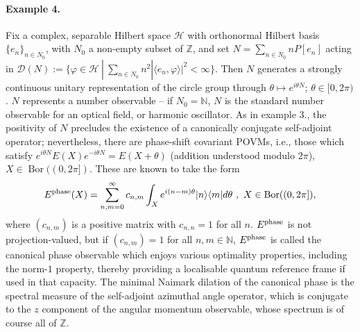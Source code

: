 \documentclass[sn-mathphys-num]{sn-jnl}%
\DeclareMathOperator{\Bor}{Bor}
\numberwithin{equation}{section}
\theoremstyle{thmstyleone}%
\theoremstyle{thmstyletwo}%
\theoremstyle{thmstylethree}%
\begin{document}
\paragraph{Example 4.}
Fix a complex, separable Hilbert space $\mathcal{H}$ with orthonormal Hilbert basis $\{e_n\}_{n \in N_0}$, with $N_0$ a non-empty subset of $\mathbb{Z}$, and set $N = \sum_{n\in N_0}n P[e_n]$ acting in $\mathcal{D}(N):=\{\varphi \in \mathcal{H}~|~\sum_{n \in N_0} n^2 |\langle e_n,\varphi \rangle|^2 < \infty\}$. Then $N$ generates a strongly continuous unitary representation of the circle group through $\theta \mapsto e^{i \theta N}$; $\theta \in [0, 2\pi)$. $N$ represents a number observable -- if $N_0 = \mathbb{N}$, $N$ is the standard number observable for an optical field, or harmonic oscillator. As in example 3., the positivity of $N$ precludes the existence of a canonically conjugate self-adjoint operator; nevertheless, there are phase-shift covariant POVMs, i.e., those which satisfy $ e^{i \theta N}E(X) e^{-i \theta N} = E(X + \theta)$ (addition understood modulo $2 \pi$), $X \in \Bor((0,2 \pi])$. These are known to take the form \cite{lahti1999covariant}
\begin{equation}
    E^{\rm{phase}}(X)= \sum_{n,m=0}^{\infty}c_{n,m}\int_X e^{i(n-m)\theta}|{n}\rangle \langle{m} | d \theta~,~X \in \Bor((0,2\pi]),
\end{equation}
where $(c_{n,m})$ is a positive matrix with $c_{n,n}=1$ for all $n$. $E^{\rm{phase}}$ is not projection-valued, but if $(c_{n,m})=1$ for all $n,m \in \mathbb{N}$, $E^{\rm{phase}}$ is called the canonical phase observable \cite{lahti2000characterizations} which enjoys various optimality properties, including the norm-$1$ property, thereby providing a localisable quantum reference frame if used in that capacity. The minimal Naimark dilation of the canonical phase is the spectral measure of the self-adjoint azimuthal angle operator, which is conjugate to the $z$ component of the angular momentum observable, whose spectrum is of course all of $\mathbb{Z}$.
\end{document}
